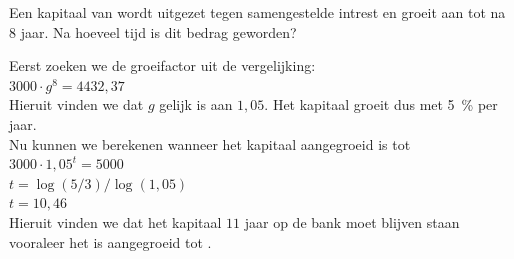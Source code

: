 \begin{oef}
Een kapitaal van  wordt uitgezet tegen samengestelde intrest
en groeit aan tot  na 8 jaar. Na hoeveel tijd is dit bedrag  geworden?
\begin{opl}
Eerst zoeken we de groeifactor uit de vergelijking:\\
$3000\cdot g^{8} = 4432,37$\\
Hieruit vinden we dat $g$ gelijk is aan $1,05$. Het kapitaal groeit dus met \SI{5}{\percent} per jaar.\\
Nu kunnen we berekenen wanneer het kapitaal aangegroeid is tot \\
$3000\cdot 1,05^{t} = 5000$\\
$t = \log(5/3)/\log(1,05)$\\
$t = 10,46$\\
Hieruit vinden we dat het kapitaal $11$ jaar op de bank moet blijven staan vooraleer het is aangegroeid tot .
\end{opl}
\end{oef}
  

%
%
%


